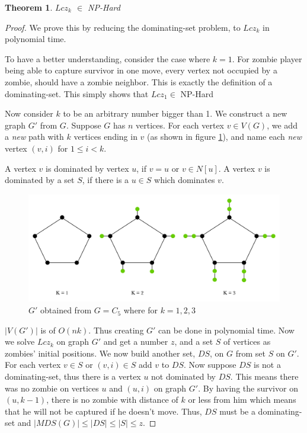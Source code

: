 \documentclass[1p]{elsarticle}
\newtheorem{theorem}{Theorem}
\begin{document}
	\begin{theorem}
		$Lcz_k$ $\in$ NP-Hard
	\end{theorem}
	\begin{proof}
		We prove this by reducing the dominating-set problem, to $Lcz_k$ in polynomial time.

		To have a better understanding, consider the case where $k=1$. For zombie player being able to capture survivor in
		one move, every vertex not occupied by a zombie, should have a zombie neighbor. This is exactly the definition
		of a dominating-set. This simply shows that $Lcz_1 \in$ NP-Hard 

		Now consider $k$ to be an arbitrary number bigger than 1. We construct a new graph $G'$ from $G$. Suppose $G$
		has $n$ vertices. For each vertex $v \in V(G)$, we add a {\it new} path with $k$ vertices ending in $v$ (as
		shown in figure \ref{fig:p7}), and name each {\it new} vertex $(v,i)$ for $1 \leq i < k$. 
		
		A vertex $v$ is dominated by vertex $u$, if $v = u$ or $v \in N[u]$. A vertex $v$ is dominated by a set $S$, if
		there is a $u \in S$ which dominates $v$.
		
		\begin{figure}[h!]
			\centering
			\includegraphics[width=0.9\linewidth]{fig/LCZ.png}
			\caption{$G'$ obtained from $G = C_5$ where for $k = 1,2,3$}
			\label{fig:p7}
		\end{figure}		


		$|V(G')|$ is of $O(nk)$. Thus creating $G'$ can be done in polynomial time. Now we solve $Lcz_k$ on graph $G'$
		and get a number $z$, and a set $S$ of vertices as zombies' initial positions. We now build another set,
		$DS$, on $G$ from set $S$ on $G'$. For each vertex $v \in S$ or $(v,i) \in S$ add $v$ to $DS$. Now suppose $DS$
		is not a dominating-set, thus there is a vertex $u$ not dominated by $DS$. This means there was no zombie on
		vertices $u$ and $(u,i)$ on graph $G'$. By having the survivor on $(u,k-1)$, there is no zombie with distance of
		$k$ or less from him which means that he will not be captured if he doesn't move. Thus, $DS$ must be a
		dominating-set and $ |MDS(G)| \leq |DS| \leq |S| \leq z$.


\end{proof}
\end{document}
